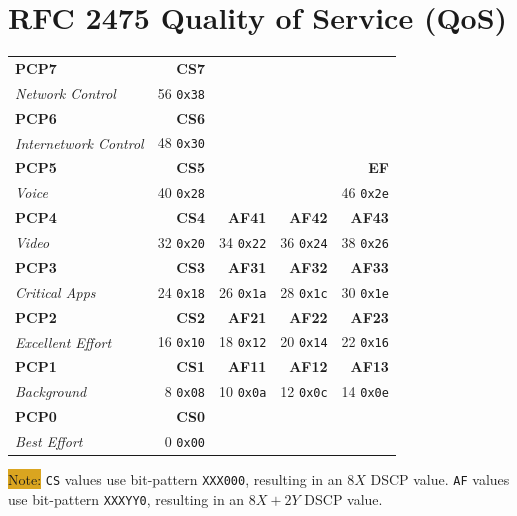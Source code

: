 \documentclass[12pt]{article}
\newcommand{\note}[1]{\colorbox{#1}{Note:}}
\begin{document}
\section{RFC 2475 Quality of Service (QoS) \label{sec:QOS}}
	\begin{table}[H]
	\centering
	\begin{tabular}{ l r r r r }
	\textbf{PCP7}			& \textbf{CS7}	&			&			&\\
	\textit{Network Control}	& 56 \texttt{0x38}	&			&			&\\
	\textbf{PCP6}			& \textbf{CS6}	&			&			&\\
	\textit{Internetwork Control}	& 48 \texttt{0x30}	&			&			&\\
	\textbf{PCP5}			& \textbf{CS5}	&			&			& \textbf{EF}\\
	\textit{Voice}			& 40 \texttt{0x28}	&			&			& 46 \texttt{0x2e}\\
	\textbf{PCP4}			& \textbf{CS4}	& \textbf{AF41}	& \textbf{AF42}	& \textbf{AF43}\\
	\textit{Video}			& 32 \texttt{0x20} & 34 \texttt{0x22} & 36 \texttt{0x24} & 38 \texttt{0x26}\\
	\textbf{PCP3}			& \textbf{CS3}	& \textbf{AF31}	& \textbf{AF32}	& \textbf{AF33}\\
	\textit{Critical Apps}		& 24 \texttt{0x18} & 26 \texttt{0x1a} & 28 \texttt{0x1c} & 30 \texttt{0x1e}\\
	\textbf{PCP2}			& \textbf{CS2}	& \textbf{AF21}	& \textbf{AF22}	& \textbf{AF23}\\
	\textit{Excellent Effort}		& 16 \texttt{0x10} & 18 \texttt{0x12} & 20 \texttt{0x14} & 22 \texttt{0x16}\\
	\textbf{PCP1}			& \textbf{CS1}	& \textbf{AF11}	& \textbf{AF12}	& \textbf{AF13}\\
	\textit{Background}		& 8 \texttt{0x08} & 10 \texttt{0x0a} & 12 \texttt{0x0c} & 14 \texttt{0x0e}\\
	\textbf{PCP0}			& \textbf{CS0}	&			&			&\\
	\textit{Best Effort}			& 0 \texttt{0x00} &			&			&\\
	\end{tabular}
	\end{table}
	\vspace{8pt}
	\note{Goldenrod} \texttt{CS} values use bit-pattern \texttt{XXX000}, resulting in an $8X$ DSCP value. \texttt{AF} values use bit-pattern \texttt{XXXYY0}, resulting in an $8X+2Y$ DSCP value.
\end{document}
